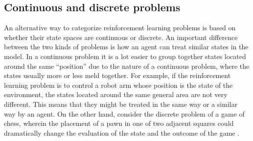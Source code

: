 \subsection{Continuous and discrete problems}
An alternative way to categorize reinforcement learning problems is based on whether their state spaces are continuous or discrete. An important difference between the two kinds of problems is how an agent can treat similar states in the model. In a continuous problem it is a lot easier to group together states located around the same ``position'' due to the nature of a continuous problem, where the states usually more or less meld together. For example, if the reinforcement learning problem is to control a robot arm whose position is the state of the environment, the states located around the same general area are not very different. This means that they might be treated in the same way or a similar way by an agent. On the other hand, consider the discrete problem of a game of chess, wherein the placement of a pawn in one of two adjacent squares could dramatically change the evaluation of the state and the outcome of the game \parencite{barto1998reinforcement}.
